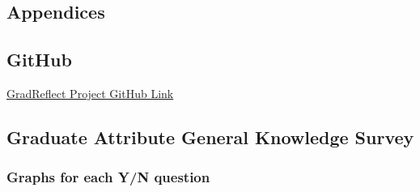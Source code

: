\documentclass{l4proj}
\begin{document}
\begin{appendices}

\chapter{Appendices}







\section{GitHub}\label{AppendixGitHub}

\href{https://github.com/gmtmcd/Level-4-Individual-Project}{GradReflect Project GitHub Link}

\section{Graduate Attribute General Knowledge Survey} \label{Appendix-gradAttributeSurvey}

\subsection{Graphs for each Y/N question}


\end{appendices}
\end{document}

